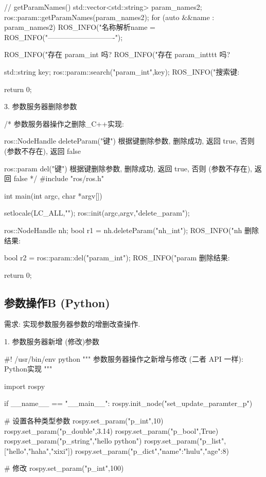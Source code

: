 \documentclass[openany, fontset=windowsold]{ctexbook}
\theoremstyle{kaiti}
\theoremstyle{normal}
\begin{document}
\begin{cpp}
{      // getParamNames()
      std::vector<std::string> param_names2;
      ros::param::getParamNames(param_names2);
      for (auto &&name : param_names2)
      {
          ROS_INFO("名称解析name = %
      }
      ROS_INFO("----------------------------");

      ROS_INFO("存在 param_int 吗? %
      ROS_INFO("存在 param_intttt 吗? %

      std::string key;
      ros::param::search("param_int",key);
      ROS_INFO("搜索键:%

      return 0;
  }
\end{cpp}

3. 参数服务器删除参数

\begin{cpp}
  /* 
      参数服务器操作之删除_C++实现:

      ros::NodeHandle
          deleteParam("键")
          根据键删除参数, 删除成功, 返回 true, 否则 (参数不存在), 返回 false

      ros::param
          del("键")
          根据键删除参数, 删除成功, 返回 true, 否则 (参数不存在), 返回 false
  */
  #include "ros/ros.h"

  int main(int argc, char *argv[])
  {   
      setlocale(LC_ALL,"");
      ros::init(argc,argv,"delete_param");

      ros::NodeHandle nh;
      bool r1 = nh.deleteParam("nh_int");
      ROS_INFO("nh 删除结果:%

      bool r2 = ros::param::del("param_int");
      ROS_INFO("param 删除结果:%

      return 0;
  }
\end{cpp}

\subsection{参数操作B (Python)}

需求: 实现参数服务器参数的增删改查操作.

1. 参数服务器新增 (修改)参数

\begin{python}
  #! /usr/bin/env python
  """
      参数服务器操作之新增与修改 (二者 API 一样): Python实现
  """

  import rospy

  if __name__ == "__main__":
      rospy.init_node("set_update_paramter_p")

      # 设置各种类型参数
      rospy.set_param("p_int",10)
      rospy.set_param("p_double",3.14)
      rospy.set_param("p_bool",True)
      rospy.set_param("p_string","hello python")
      rospy.set_param("p_list",["hello","haha","xixi"])
      rospy.set_param("p_dict",{"name":"hulu","age":8})

      # 修改
      rospy.set_param("p_int",100)
\end{python}
\end{document}
